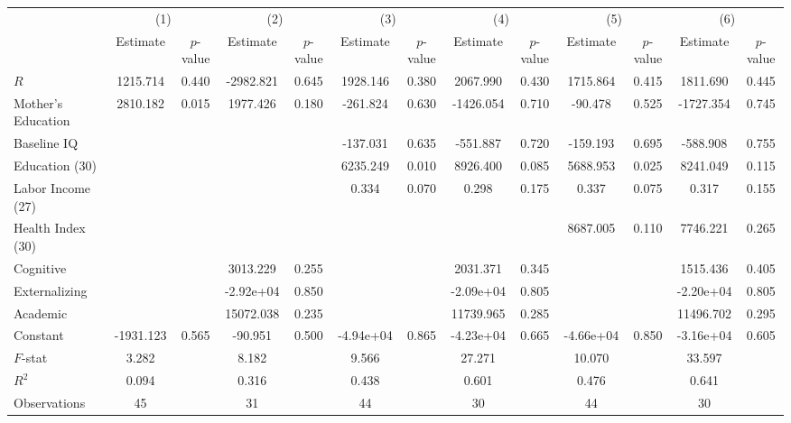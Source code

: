 
\begin{tabular}{lcccccccccccc} \toprule
 & \multicolumn{2}{c}{(1)}  &  \multicolumn{2}{c}{(2)}  &  \multicolumn{2}{c}{(3)}  &  \multicolumn{2}{c}{(4)}  & \multicolumn{2}{c}{(5)} & \multicolumn{2}{c}{(6)} \\  
 & Estimate & $p$-value & Estimate & $p$-value & Estimate & $p$-value & Estimate & $p$-value & Estimate & $p$-value & Estimate & $p$-value \\ \midrule
$R$ &  1215.714 &     0.440 & -2982.821 &     0.645 &  1928.146 &     0.380 &  2067.990 &     0.430 &  1715.864 &     0.415 &  1811.690 &     0.445 \\  
Mother's Education &  2810.182 &     0.015 &  1977.426 &     0.180 &  -261.824 &     0.630 & -1426.054 &     0.710 &   -90.478 &     0.525 & -1727.354 &     0.745 \\  
Baseline IQ &         &         &         &         &  -137.031 &     0.635 &  -551.887 &     0.720 &  -159.193 &     0.695 &  -588.908 &     0.755 \\  
Education (30) &         &         &         &         &  6235.249 &     0.010 &  8926.400 &     0.085 &  5688.953 &     0.025 &  8241.049 &     0.115 \\  
Labor Income (27) &         &         &         &         &     0.334 &     0.070 &     0.298 &     0.175 &     0.337 &     0.075 &     0.317 &     0.155 \\  
Health Index (30) &         &         &         &         &         &         &         &         &  8687.005 &     0.110 &  7746.221 &     0.265 \\  
Cognitive &         &         &  3013.229 &     0.255 &         &         &  2031.371 &     0.345 &         &         &  1515.436 &     0.405 \\  
Externalizing &         &         & -2.92e+04 &     0.850 &         &         & -2.09e+04 &     0.805 &         &         & -2.20e+04 &     0.805 \\  
Academic &         &         & 15072.038 &     0.235 &         &         & 11739.965 &     0.285 &         &         & 11496.702 &     0.295 \\  
Constant & -1931.123 &     0.565 &   -90.951 &     0.500 & -4.94e+04 &     0.865 & -4.23e+04 &     0.665 & -4.66e+04 &     0.850 & -3.16e+04 &     0.605 \\  \midrule
$F$-stat &     3.282 &         &     8.182 &         &     9.566 &         &    27.271 &         &    10.070 &         &    33.597 &         \\  
$R^2$ &     0.094 &         &     0.316 &         &     0.438 &         &     0.601 &         &     0.476 &         &     0.641 &         \\  
Observations &    45 &         &    31 &         &    44 &         &    30 &         &    44 &         &    30 &         \\  
\bottomrule \end{tabular}

